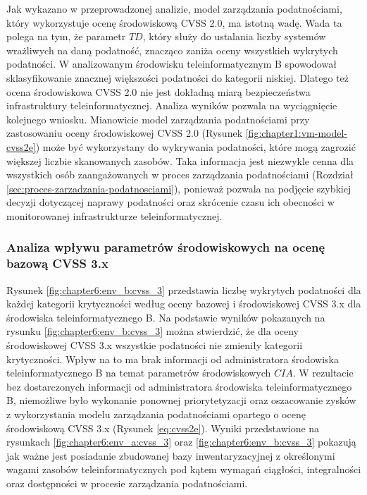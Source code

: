 \bigbreak
Jak wykazano w przeprowadzonej analizie, model zarządzania podatnościami, który wykorzystuje ocenę środowiskową CVSS 2.0, ma istotną wadę. Wada ta polega na tym, że parametr $TD$, który służy do ustalania liczby systemów wrażliwych na daną podatność, znacząco zaniża oceny wszystkich wykrytych podatności. W analizowanym środowisku teleinformatycznym B spowodował sklasyfikowanie znacznej większości podatności do kategorii niskiej. Dlatego też ocena środowiskowa CVSS 2.0 nie jest dokładną miarą bezpieczeństwa infrastruktury teleinformatycznej. Analiza wyników pozwala na wyciągnięcie kolejnego wniosku. Mianowicie model zarządzania podatnościami przy zastosowaniu oceny środowiskowej CVSS 2.0 (Rysunek \ref{fig:chapter1:vm-model-cvss2e}) może być wykorzystany do wykrywania podatności, które mogą zagrozić większej liczbie skanowanych zasobów. Taka informacja jest niezwykle cenna dla wszystkich osób zaangażowanych w proces zarządzania podatnościami (Rozdział \ref{sec:proces-zarzadzania-podatnosciami}), ponieważ pozwala na podjęcie szybkiej decyzji dotyczącej naprawy podatności oraz skrócenie czasu ich obecności w monitorowanej infrastrukturze teleinformatycznej.


\subsubsection{Analiza wpływu parametrów środowiskowych na ocenę bazową CVSS 3.x}

Rysunek \ref{fig:chapter6:env_b:cvss_3} przedstawia liczbę wykrytych podatności dla każdej kategorii krytyczności według oceny bazowej i środowiskowej CVSS 3.x dla środowiska teleinformatycznego B. Na podstawie wyników pokazanych na rysunku \ref{fig:chapter6:env_b:cvss_3} można stwierdzić, że dla oceny środowiskowej CVSS 3.x wszystkie podatności nie zmieniły kategorii krytyczności. Wpływ na to ma brak informacji od administratora środowiska teleinformatycznego B na temat parametrów środowiskowych $CIA$. W rezultacie bez dostarczonych informacji od administratora środowiska teleinformatycznego B, niemożliwe było wykonanie ponownej priorytetyzacji oraz oszacowanie zysków z wykorzystania modelu zarządzania podatnościami opartego o ocenę środowiskową CVSS 3.x (Rysunek \ref{eq:cvss2e}). Wyniki przedstawione na rysunkach \ref{fig:chapter6:env_a:cvss_3} oraz \ref{fig:chapter6:env_b:cvss_3} pokazują jak ważne jest posiadanie zbudowanej bazy inwentaryzacyjnej z określonymi wagami zasobów teleinformatycznych pod kątem wymagań ciągłości, integralności oraz dostępności w procesie zarządzania podatnościami.


